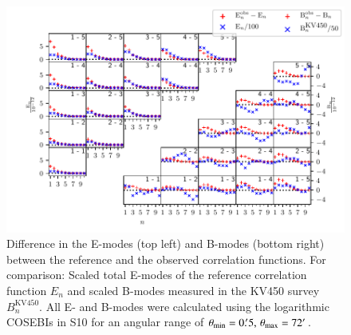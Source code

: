 \documentclass{aa}
\renewcommand{\rm}{\mathrm}
\begin{document}
\begin{figure}
\centering
\includegraphics[width = 0.9\linewidth]{images/ebmodes0p5t72.pdf}
\caption{Difference in the E-modes (top left) and B-modes (bottom right) between the reference and the observed correlation functions. For comparison: Scaled total E-modes of the reference correlation function $E_n$ and scaled B-modes measured in the KV450 survey $B_n^{\rm{KV450}}$. All E- and B-modes were calculated using the logarithmic COSEBIs in S10 for an angular range of $\theta_{\rm{min}}=0.\!^\prime 5,\,\theta_{\rm{max}}=72\arcmin$.}
\label{fig:bmodes_cosebi}
\end{figure}

\end{document}
